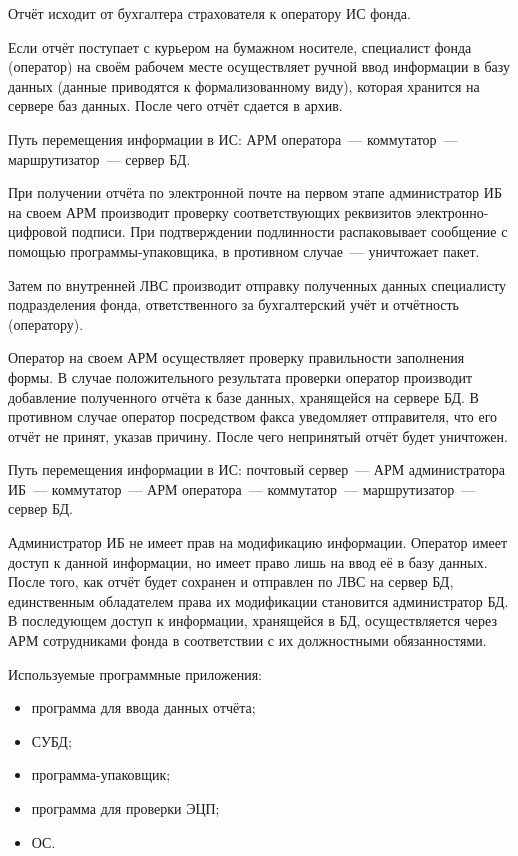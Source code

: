Отчёт исходит от бухгалтера страхователя к оператору ИС фонда.

\point Если отчёт поступает с курьером на бумажном носителе,
специалист фонда (оператор) на своём рабочем месте осуществляет ручной
ввод информации в базу данных (данные приводятся к формализованному
виду), которая хранится на сервере баз данных. После чего отчёт
сдается в архив.

\point Путь перемещения информации в ИС: АРМ оператора~---
коммутатор~--- маршрутизатор~--- сервер БД.

\point При получении отчёта по электронной почте на первом этапе
администратор ИБ на своем АРМ производит проверку соответствующих
реквизитов электронно-цифровой подписи. При подтверждении подлинности
распаковывает сообщение с помощью программы-упаковщика, в противном
случае~--- уничтожает пакет.

Затем по внутренней ЛВС производит отправку полученных данных
специалисту подразделения фонда, ответственного за бухгалтерский учёт
и отчётность (оператору).

Оператор на своем АРМ осуществляет проверку правильности заполнения
формы. В случае положительного результата проверки оператор производит
добавление полученного отчёта к базе данных, хранящейся на сервере БД.
В противном случае оператор посредством факса уведомляет отправителя,
что его отчёт не принят, указав причину. После чего непринятый отчёт
будет уничтожен.

\point Путь перемещения информации в ИС: почтовый сервер~--- АРМ
администратора ИБ~--- коммутатор~--- АРМ оператора~--- коммутатор~---
маршрутизатор~--- сервер БД.

\point Администратор ИБ не имеет прав на модификацию
информации. Оператор имеет доступ к данной информации, но имеет право
лишь на ввод её в базу данных. После того, как отчёт будет сохранен и
отправлен по ЛВС на сервер БД, единственным обладателем права их
модификации становится администратор БД. В последующем доступ к
информации, хранящейся в БД, осуществляется через АРМ сотрудниками
фонда в соответствии с их должностными обязанностями.

\point Используемые программные приложения:

\begin{itemize}
\item программа для ввода данных отчёта;
\item СУБД;
\item программа-упаковщик;
\item программа для проверки ЭЦП;
\item ОС.
\end{itemize}

